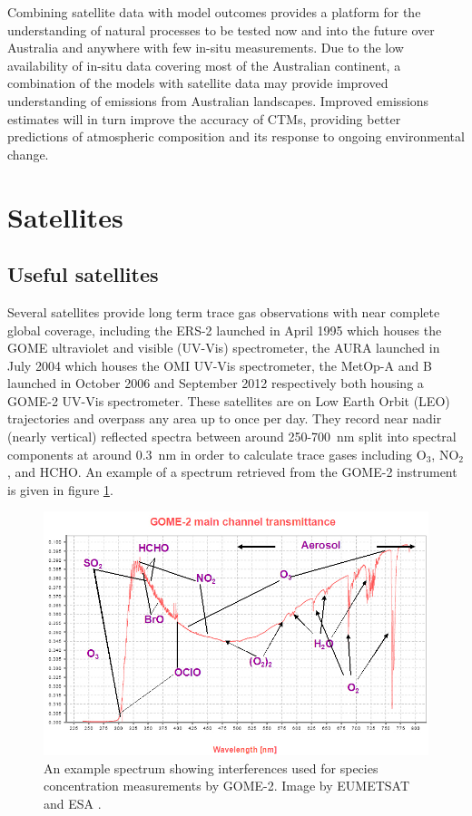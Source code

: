     Combining satellite data with model outcomes provides a platform for the understanding of natural processes to be tested now and into the future over Australia and anywhere with few in-situ measurements.
    Due to the low availability of in-situ data covering most of the Australian continent, a combination of the models with satellite data may provide improved understanding of emissions from Australian landscapes.
    Improved emissions estimates will in turn improve the accuracy of CTMs, providing better predictions of atmospheric composition and its response to ongoing environmental change.

\section{Satellites}
\label{ch1:sec:satellites}

  \subsection{Useful satellites}
    Several satellites provide long term trace gas observations with near complete global coverage, including the ERS-2 launched in April 1995 which houses the GOME ultraviolet and visible (UV-Vis) spectrometer, the AURA launched in July 2004 which houses the OMI UV-Vis spectrometer, the MetOp-A and B launched in October 2006 and September 2012 respectively both housing a GOME-2 UV-Vis spectrometer.
    These satellites are on Low Earth Orbit (LEO) trajectories and overpass any area up to once per day. 
    They record near nadir (nearly vertical) reflected spectra between around 250-700~nm split into spectral components at around $0.3$~nm in order to calculate trace gases including O$_3$, NO$_2$, and HCHO.
    An example of a spectrum retrieved from the GOME-2 instrument is given in figure \ref{ch1:fig:gomeproducts}.

    \begin{figure}
      \includegraphics[width=\textwidth]{Figures/GOME_SPECTRUM.jpg}
      \caption{An example spectrum showing interferences used for species concentration measurements by GOME-2. Image by EUMETSAT and ESA \citep{GOME2Image}.}
      \label{ch1:fig:gomeproducts}
    \end{figure}

